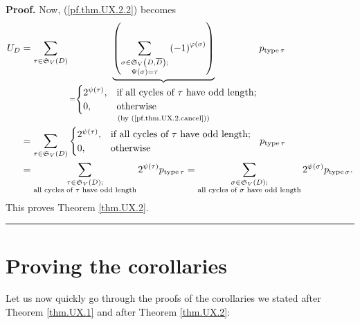 \documentclass[numbers=enddot,12pt,final,onecolumn,notitlepage]{scrartcl}%
\numberwithin{exer}{section}
\theoremstyle{definition}
\newenvironment{proof}[1][Proof]{\noindent\textbf{#1.} }{\ \rule{0.5em}{0.5em}}
\let\sumnonlimits\sum
\renewcommand{\sum}{\sumnonlimits\limits}
\begin{document}
\begin{proof}
Now, (\ref{pf.thm.UX.2.2}) becomes%
\begin{align*}
U_{D}  &  =\sum_{\tau\in\mathfrak{S}_{V}\left(  D\right)  }\underbrace{\left(
\sum_{\substack{\sigma\in\mathfrak{S}_{V}\left(  D,\overline{D}\right)
;\\\Psi\left(  \sigma\right)  =\tau}}\left(  -1\right)  ^{\varphi\left(
\sigma\right)  }\right)  }_{\substack{=%
\begin{cases}
2^{\psi\left(  \tau\right)  }, & \text{if all cycles of }\tau\text{ have odd
length};\\
0, & \text{otherwise}%
\end{cases}
\\\text{(by (\ref{pf.thm.UX.2.cancel}))}}}p_{\operatorname*{type}\tau}\\
&  =\sum_{\tau\in\mathfrak{S}_{V}\left(  D\right)  }%
\begin{cases}
2^{\psi\left(  \tau\right)  }, & \text{if all cycles of }\tau\text{ have odd
length};\\
0, & \text{otherwise}%
\end{cases}
\ \ p_{\operatorname*{type}\tau}\\
&  =\sum_{\substack{\tau\in\mathfrak{S}_{V}\left(  D\right)  ;\\\text{all
cycles of }\tau\text{ have odd length}}}2^{\psi\left(  \tau\right)
}p_{\operatorname*{type}\tau}=\sum_{\substack{\sigma\in\mathfrak{S}_{V}\left(
D\right)  ;\\\text{all cycles of }\sigma\text{ have odd length}}%
}2^{\psi\left(  \sigma\right)  }p_{\operatorname*{type}\sigma}.
\end{align*}
This proves Theorem \ref{thm.UX.2}.
\end{proof}

\section{\label{sec.pf.cors}Proving the corollaries}

Let us now quickly go through the proofs of the corollaries we stated after
Theorem \ref{thm.UX.1} and after Theorem \ref{thm.UX.2}:
\end{document}
